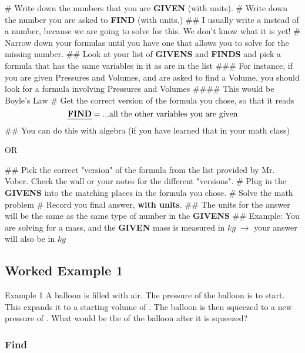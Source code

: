 \documentclass[../../Main/main.tex]{subfiles}
\begin{document}
\begin{easylist}
	# Write down the numbers that you are \textbf{GIVEN} (with units).
	# Write down the number you are asked to \textbf{FIND} (with units.)
	## I usually write a {\huge\textbf{}} instead of a number, because we are going to solve for this.  We don't know what it is yet!
	# Narrow down your formulas until you have one that allows you to solve for the missing number.
	## Look at your list of \textbf{GIVENS} and \textbf{FINDS} and pick a formula that has the same variables in it as are in the list
	### For instance, if you are given Pressures and Volumes, and are asked to find a Volume, you should look for a formula involving Pressures and Volumes
	####  This would be Boyle's Law
	# Get the correct version of the formula you chose, so that it reads \[\textbf{\emph{FIND}} = ...\text{all the other variables you are given}\]
	## You can do this with algebra (if you have learned that in your math class)

	OR

	## Pick the correct "version" of the formula from the list provided by Mr. Vober.  Check the wall or your notes for the different "versions".
	# Plug in the \textbf{GIVENS} into the matching places in the formula you chose.
	# Solve the math problem
	# Record you final answer, \textbf{with units}.
	## The units for the answer will be the same as the same type of number in the \textbf{GIVENS}
	## Example: You are solving for a mass, and the \textbf{GIVEN} mass is measured in $kg$ $\rightarrow$ your answer will also be in $kg$
\end{easylist}


\newpage
\subsection{Worked Example 1}

\begin{boxGray}{Example 1}
	A balloon is filled with air.  The pressure of the balloon is  to start.  This expands it to a starting volume of .  The balloon is then squeezed to a new pressure of .  What would be the  of the balloon after it is squeezed?
\end{boxGray}

\subsubsection{Find}
\end{document}

